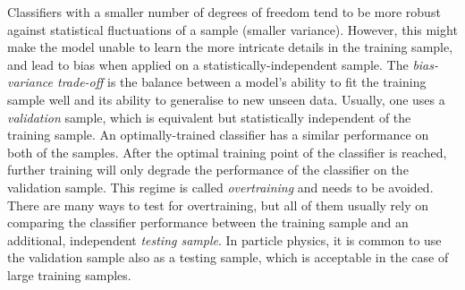 Classifiers with a smaller number of degrees of freedom tend to be more
robust against statistical fluctuations of a sample (smaller variance).
However, this might make the model unable to learn the more intricate details in the training sample, and lead to bias when applied on a statistically-independent sample.
The \textit{bias-variance trade-off} 
is the balance between a model's ability to fit the training sample well
and its ability to generalise to new unseen data. 
Usually, one uses a \textit{validation} sample, which is equivalent but statistically independent of the training sample.
An optimally-trained classifier has a similar performance on both of the samples. 
After the optimal training point of the classifier is reached, 
further training will only degrade the performance of the classifier on the validation sample.
This regime is called \textit{overtraining} and needs to be avoided.
There are many ways to test for overtraining, but all of them usually rely on comparing the classifier performance between the training sample and an additional, independent \textit{testing sample}.
In particle physics, it is common to use the validation sample also as a testing sample, which is acceptable in the case of large training samples.

